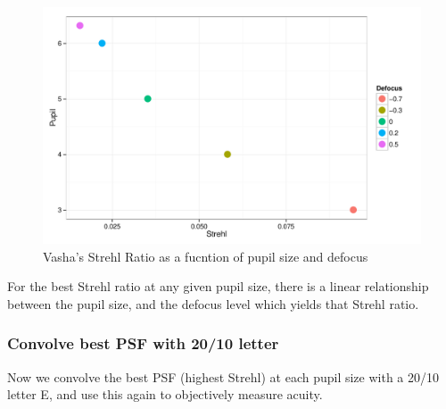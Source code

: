 \documentclass{article}
\begin{document}
\begin{figure}[H]
  \centering
    \includegraphics[width=1\linewidth]{vashabestpupilsize.pdf}
  \caption{Vasha's Strehl Ratio as a fucntion of pupil size and defocus}
  \label{fig:amtfs}
\end{figure}

For the best Strehl ratio at any given pupil size, there is a linear relationship between the pupil size, and the defocus level which yields that Strehl ratio.

\clearpage

\subsubsection{Convolve best PSF with 20/10 letter}
Now we convolve the best PSF (highest Strehl) at each pupil size with a
20/10 letter E, and use this again to objectively measure acuity.
\end{document}
